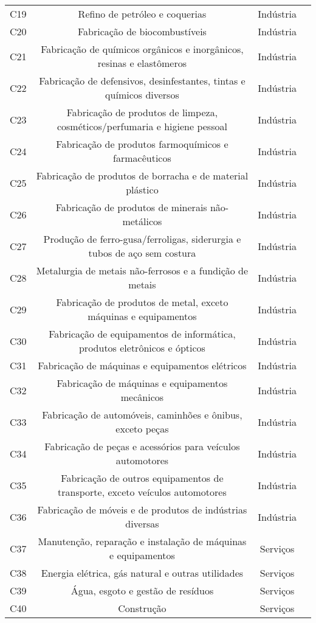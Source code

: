 \begin{apendicesenv}
\begin{small}
\begin{center}
\begin{longtable}{lccc}
				C19 & Refino de petróleo e coquerias & Indústria \\
				C20 & Fabricação de biocombustíveis & Indústria \\
				C21 & Fabricação de químicos orgânicos e inorgânicos, resinas e elastômeros & Indústria \\
				C22 & Fabricação de defensivos, desinfestantes, tintas e químicos diversos & Indústria \\
				C23 & Fabricação de produtos de limpeza, cosméticos/perfumaria e higiene   pessoal & Indústria \\
				C24 & Fabricação de produtos farmoquímicos e farmacêuticos & Indústria \\
				C25 & Fabricação de produtos de borracha e de material plástico & Indústria \\
				C26 & Fabricação de produtos de minerais não-metálicos & Indústria \\
				C27 & Produção de ferro-gusa/ferroligas, siderurgia e tubos de aço sem costura & Indústria \\
				C28 & Metalurgia de metais não-ferrosos e a fundição de metais & Indústria \\
				C29 & Fabricação de produtos de metal, exceto máquinas e equipamentos & Indústria \\
				C30 & Fabricação de equipamentos de informática, produtos eletrônicos e ópticos & Indústria \\
				C31 & Fabricação de máquinas e equipamentos elétricos & Indústria \\
				C32 & Fabricação de máquinas e equipamentos mecânicos & Indústria \\
				C33 & Fabricação de automóveis, caminhões e ônibus, exceto peças & Indústria \\
				C34 & Fabricação de peças e acessórios para veículos automotores & Indústria \\
				C35 & Fabricação de outros equipamentos de transporte, exceto veículos   automotores & Indústria \\
				C36 & Fabricação de móveis e de produtos de indústrias diversas & Indústria \\
				C37 & Manutenção, reparação e instalação de máquinas e equipamentos & Serviços \\
				C38 & Energia elétrica, gás natural e outras utilidades & Serviços \\
				C39 & Água, esgoto e gestão de resíduos & Serviços \\
				C40 & Construção & Serviços \\

\end{longtable}
\end{center}
\end{small}
\end{apendicesenv}

